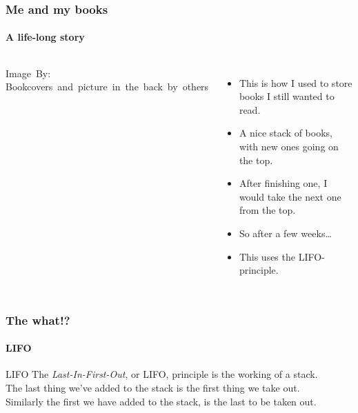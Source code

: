 \begin{frame}
	\frametitle{Me and my books}
	\framesubtitle{A life-long story}

	\begin{columns}
			\begin{center}
				\hspace*{15pt}\hbox{\scriptsize Image By:}
				\hspace*{15pt}\hbox{\scriptsize Bookcovers and picture in the back by others}
			\end{center}
		\begin{itemize}
			\item This is how I used to store books I still wanted to read.
				\pause
			\item A nice \alert{stack} of books, with new ones going on the top.
				\pause
			\item After finishing one, I would take the next one from the top.
				\pause
			\item So after a few weeks\dots
				\pause
			\item This uses the \alert{LIFO}-principle.
		\end{itemize}
	\end{columns}
\end{frame}

\begin{frame}
	\frametitle{The what!?}
	\framesubtitle{LIFO}
	
		\begin{block}{LIFO}
			The \textit{Last-In-First-Out}, or LIFO, principle is the working of a stack.\\
			\pause
			The last thing we've added to the stack is the first thing we take out.\\
			\pause
			Similarly the first we have added to the stack, is the last to be taken out.
		\end{block}	
\end{frame}

